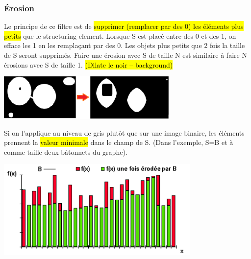 \documentclass[letterpaper, 12pt]{article}
\newcommand{\alinea}{
\hspace*{0.5cm}}
\begin{document}
		\subsubsection{\'Erosion}
			\alinea Le principe de ce filtre est de \hl{supprimer (remplacer par des 0) les éléments plus petits} que le structuring element.
				Lorsque S est placé  entre des 0 et des 1, on efface les 1 en les remplaçant par des 0. Les objets plus petits que 
				2 fois la taille de S seront supprimés. Faire une érosion avec S de taille N est similaire à faire N érosions
				avec S de taille 1. \hl{(Dilate le noir -- background)}
			\begin{center}
				\includegraphics[width=3.5in]{Images/erosion}
			\end{center}
			\begin{minipage}{0.33\textwidth}
				\alinea Si on l'applique au niveau de gris plutôt que sur une image binaire, les éléments prennent la \hl{valeur minimale}
					dans le champ de S. (Dans l'exemple, S=B et à comme taille deux bâtonnets du graphe).
			\end{minipage} \hfill
			\begin{minipage}{0.66\textwidth}
				\begin{center}
					\includegraphics[width=3.95in]{Images/erosion2}
				\end{center}
			\end{minipage}
\end{document}
